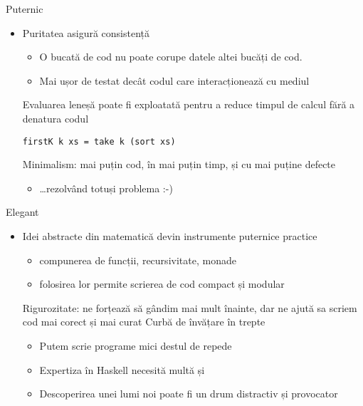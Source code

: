 \documentclass[handout,xcolor=pdftex,romanian,colorlinks]{beamer}
\begin{document}
\begin{frame}[fragile]{Puternic}
\begin{itemize}
\item Puritatea asigură consistență

\begin{itemize}
\item O bucată de cod nu poate corupe datele altei bucăți de cod.
\item Mai ușor de testat decât codul care interacționează cu mediul
\end{itemize}

\vitem Evaluarea leneșă poate fi exploatată pentru a reduce timpul de calcul fără a denatura codul
\begin{lstlisting}
firstK k xs = take k (sort xs)
\end{lstlisting}

\vitem Minimalism: mai puțin cod, în mai puțin timp, și cu mai puține defecte
\begin{itemize}
\item
\dots rezolvând totuși problema :-)
\end{itemize}
\end{itemize}
\end{frame}

\begin{frame}{Elegant}
\begin{itemize}
\item Idei abstracte din matematică devin instrumente puternice practice 
\begin{itemize}
\item compunerea de funcții, recursivitate, monade 
\item folosirea lor permite scrierea de cod compact și modular
\end{itemize}
\vitem Rigurozitate:  ne forțează să gândim mai mult înainte, dar ne ajută sa scriem cod mai corect și mai curat
\vitem Curbă de învățare în trepte
\begin{itemize}
\item Putem scrie programe mici destul de repede
\item Expertiza în Haskell necesită multă  și 
\item Descoperirea unei lumi noi poate fi un drum distractiv și provocator
\end{itemize}
\end{itemize}
\end{frame}
\end{document}

